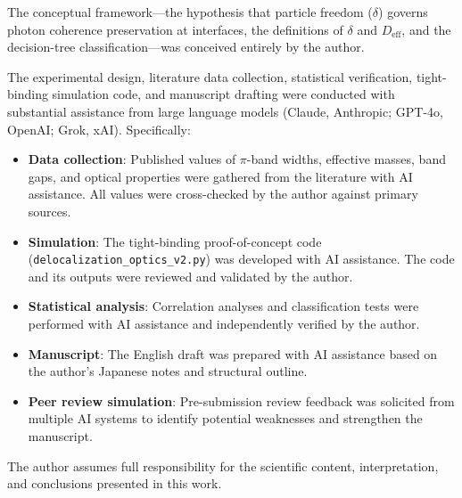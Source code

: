 \documentclass[twocolumn,showpacs,preprintnumbers,amsmath,amssymb,prb]{revtex4-2}
\begin{document}
The conceptual framework---the hypothesis that particle freedom
($\delta$) governs photon coherence preservation at interfaces, the
definitions of $\delta$ and $D_\mathrm{eff}$, and the decision-tree
classification---was conceived entirely by the author.

The experimental design, literature data collection, statistical
verification, tight-binding simulation code, and manuscript drafting
were conducted with substantial assistance from large language models
(Claude, Anthropic; GPT-4o, OpenAI; Grok, xAI). Specifically:

\begin{itemize}
  \item \textbf{Data collection}: Published values of $\pi$-band
    widths, effective masses, band gaps, and optical properties were
    gathered from the literature with AI assistance. All values were
    cross-checked by the author against primary sources.
  \item \textbf{Simulation}: The tight-binding proof-of-concept code
    (\texttt{delocalization\_optics\_v2.py}) was developed with AI
    assistance. The code and its outputs were reviewed and validated
    by the author.
  \item \textbf{Statistical analysis}: Correlation analyses and
    classification tests were performed with AI assistance and
    independently verified by the author.
  \item \textbf{Manuscript}: The English draft was prepared with AI
    assistance based on the author's Japanese notes and structural
    outline.
  \item \textbf{Peer review simulation}: Pre-submission review
    feedback was solicited from multiple AI systems to identify
    potential weaknesses and strengthen the manuscript.
\end{itemize}

\noindent The author assumes full responsibility for the scientific
content, interpretation, and conclusions presented in this work.


\end{document}
